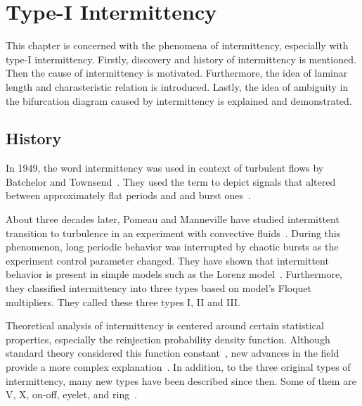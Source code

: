 \chapter{Type-I Intermittency}
\label{chap:type-I intermittency}

This chapter is concerned with the phenomena of intermittency, especially with type-I intermittency.
Firstly, discovery and history of intermittency is mentioned.
Then the cause of intermittency is motivated.
Furthermore, the idea of laminar length and charasteristic relation is introduced.
Lastly, the idea of ambiguity in the bifurcation diagram caused by intermittency is explained and demonstrated.

\section{History}
In 1949, the word intermittency was used in context of turbulent flows by Batchelor and Townsend~\cite{Batchelor19491025}.
They used the term to depict signals that altered between approximately flat periods and and burst ones~\cite{Elaskar2017}.
\par
About three decades later, Pomeau and Manneville have studied intermittent transition to turbulence in an experiment with convective fluids~\cite{Pomeau1980}.
During this phenomenon, long periodic behavior was interrupted by chaotic bursts as the experiment control parameter changed.
They have shown that intermittent behavior is present in simple models such as the Lorenz model~\cite{Lorenz2004}.
Furthermore, they classified intermittency into three types based on model's Floquet multipliers.
They called these three types I, II and III.
\par
Theoretical analysis of intermittency is centered around certain statistical properties, especially the reinjection probability density function.
Although standard theory considered this function constant~\cite{Dubois1983}, new advances in the field provide a more complex explanation~\cite{Elaskar2022}.
In addition, to the three original types of intermittency, many new types have been described since then.
Some of them are V, X, on-off, eyelet, and ring~\cite{Elaskar2022}.

